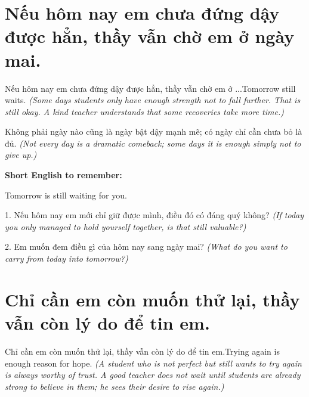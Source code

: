 \section{Nếu hôm nay em chưa đứng dậy được hẳn, thầy vẫn chờ em ở ngày mai.}
\begin{truyen}{Nếu hôm nay em chưa đứng dậy được hẳn, thầy vẫn chờ em ở ...}{Tomorrow still waits.}
\textit{(Some days students only have enough strength not to fall further. That is still okay. A kind teacher understands that some recoveries take more time.)}
\end{truyen}

\begin{baihoc}
Không phải ngày nào cũng là ngày bật dậy mạnh mẽ; có ngày chỉ cần chưa bỏ là đủ.
\textit{(Not every day is a dramatic comeback; some days it is enough simply not to give up.)}
\end{baihoc}

\begin{ghinhoanh}
\textbf{Short English to remember:}

Tomorrow is still waiting for you.

\end{ghinhoanh}

\begin{tuhocnhanh}
1. Nếu hôm nay em mới chỉ giữ được mình, điều đó có đáng quý không? \textit{(If today you only managed to hold yourself together, is that still valuable?)}

2. Em muốn đem điều gì của hôm nay sang ngày mai? \textit{(What do you want to carry from today into tomorrow?)}
\end{tuhocnhanh}
\ngancach


\section{Chỉ cần em còn muốn thử lại, thầy vẫn còn lý do để tin em.}
\begin{truyen}{Chỉ cần em còn muốn thử lại, thầy vẫn còn lý do để tin em.}{Trying again is enough reason for hope.}
\textit{(A student who is not perfect but still wants to try again is always worthy of trust. A good teacher does not wait until students are already strong to believe in them; he sees their desire to rise again.)}
\end{truyen}


